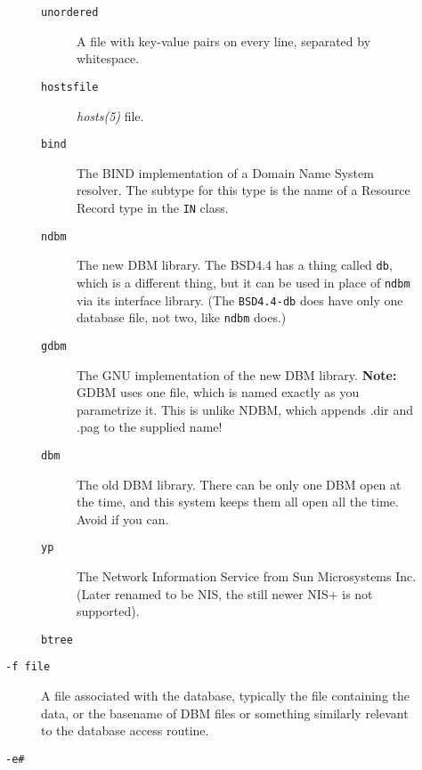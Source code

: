 \begin{description}
\begin{description}
\begin{description}
\item[{\tt unordered}] \mbox{}

A file with key-value pairs on every line, 
separated by whitespace. 

\item[{\tt hostsfile}] \mbox{}

{\em hosts(5)\/} file.

\item[{\tt bind}] \mbox{}

The BIND implementation of a Domain Name System 
resolver. The subtype for this type is the name of a Resource Record 
type in the {\tt IN} class.

\item[{\tt ndbm}] \mbox{}

The new DBM library. The BSD4.4 has a thing called 
{\tt db}, which is a different thing, but it can be used in place 
of {\tt ndbm} via its interface library. (The {\tt BSD4.4-db} 
does have only one database file, not two, like {\tt ndbm} does.)

\item[{\tt gdbm}] \mbox{}

The GNU implementation of the new DBM library. 
{\bf Note:} GDBM uses one file, which is named exactly as you 
parametrize it. This is unlike NDBM, which appends .dir and .pag to 
the supplied name!

\item[{\tt dbm }] \mbox{}

The old DBM library. There can be only one DBM 
open at the time, and this system keeps them all open all the time. 
Avoid if you can.

\item[{\tt yp}] \mbox{}

The Network Information Service from Sun Microsystems 
Inc. (Later renamed to be NIS, the still newer NIS+ is not supported).

\item[{\tt btree}] \mbox{}



\end{description}


\item[{\tt -f file}] \mbox{}

A file associated with the database, typically 
the file containing the data, or the basename of DBM files or something 
similarly relevant to the database access routine. 

\item[{\tt -e\#}] \mbox{}


\end{description}
\end{description}
